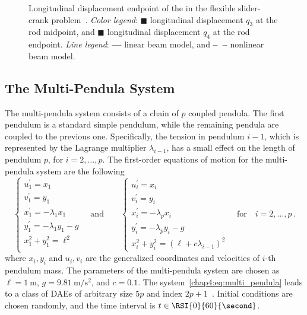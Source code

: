 \begin{figure}[htb]
  \centering
  \small{}
  \caption{Longitudinal displacement endpoint of the in the flexible slider-crank problem~\cite{lioen1998test, mazzia2008test}. \emph{Color legend}: \textcolor{mycolor2}{$\blacksquare$} longitudinal displacement $q_3$ at the rod midpoint, and \textcolor{mycolor1}{$\blacksquare$} longitudinal displacement $q_4$ at the rod endpoint. \emph{Line legend}: \textbf{---} linear beam model, and \textbf{--~--} nonlinear beam model.}
  \label{chap4:fig:flexible_slider_crank}
\end{figure}

\subsection{The Multi-Pendula System}

The multi-pendula system consists of a chain of $p$ coupled pendula. The first pendulum is a standard simple pendulum, while the remaining pendula are coupled to the previous one. Specifically, the tension in pendulum $i - 1$, which is represented by the Lagrange multiplier $\lambda_{i-1}$, has a small effect on the length of
pendulum $p$, for $i = 2, \dots, p$. The first-order equations of motion for the multi-pendula system are the following~\cite{nedialkov2008solvingIII}
%
\begin{equation}
  \begin{cases}
    u_1^{\prime} = x_1 \\
    v_1^{\prime} = y_1 \\
    x_1^{\prime} = -\lambda_1 x_1 \\
    y_1^{\prime} = -\lambda_1 y_1 - g \\
    x_1^2 + y_1^2 = \ell^2 \\
  \end{cases}
  \quad \text{and} \qquad
  \begin{cases}
    u_i^{\prime} = x_i \\
    v_i^{\prime} = y_i \\
    x_i^{\prime} = -\lambda_p x_i \\
    y_i^{\prime} = -\lambda_p y_i - g \\
    x_i^2 + y_i^2 = (\ell + c\lambda_{i-1})^2
  \end{cases}
  \quad \text{for} \quad i = 2, \dots, p \, \text{.}
  \label{chap4:eq:multi_pendula}
\end{equation}
%
where $x_i, y_i$ and $u_i, v_i$ are the generalized coordinates and velocities of $i$-th pendulum mass. The parameters of the multi-pendula system are chosen as $\ell = \SI{1}{\meter}$, $g = \SI{9.81}{\meter\per\second\squared}$, and $c = 0.1$. The system~\eqref{chap4:eq:multi_pendula} leads to a class of \acp{DAE} of arbitrary size $5p$ and index $2p+1$~\cite{nedialkov2008solvingIII}. Initial conditions are chosen randomly, and the time interval is $t \in \RSI{0}{60}{\second}$.

